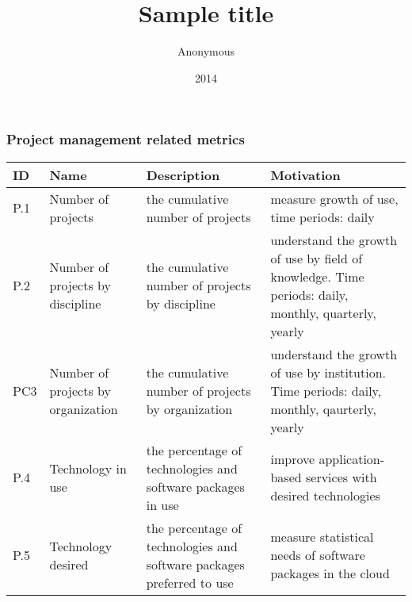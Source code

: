 \documentclass{beamer}
\title{Sample title}
\author{Anonymous}
\institute{ShareLaTeX}
\date{2014}
\newcommand{\eTABLE}{\end{tabular}
\end{center}
\end{scriptsize}
}
\newcommand{\bTABLE}[2]{
\frametitle{#1}
\bigskip
\begin{scriptsize}
\begin{center}
\begin{tabular}{lp{0.15\textwidth}p{0.3\textwidth}p{0.4\textwidth}}
\hline
\rowcolor{blue!20} \bf ID & \bf Name & \bf Description & \bf Motivation \\
\hline}
\newenvironment{METRICTABLE}[2] {\bTABLE{#1}{#2}}{\eTABLE}
\begin{document}
 

 



\begin{frame}[shrink]
\begin{METRICTABLE}{Project management related metrics}{T:project}
P.1 & Number of projects &  the cumulative number of projects &  measure growth of use, time periods:  daily \\ \hline
P.2 & Number of projects by discipline &  the cumulative number of projects by discipline & understand the growth of use by field of knowledge. Time periods: daily, monthly, quarterly, yearly \\ \hline
PC3 & Number of projects by organization &  the cumulative number of projects by organization & understand the growth of use by institution. Time periods: daily, monthly, qaurterly, yearly \\ \hline
P.4 & Technology in use   &  the percentage of technologies and software packages in use &  improve application-based services with desired technologies \\ \hline
P.5 & Technology desired &  the percentage of technologies and software packages preferred to use & measure statistical needs of software packages in the cloud \\ \hline
\end{METRICTABLE}
\end{frame}
\end{document}
